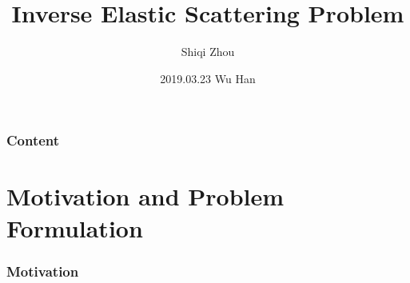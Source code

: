 \documentclass[cjk,8pt]{beamer}
\begin{document}
\begin{CJK*}{GBK}{kai}
\CJKtilde
\title[]{Inverse Elastic Scattering Problem}

\author[]{Shiqi Zhou}
\date[]{2019.03.23 Wu Han}




\begin{frame}
  \titlepage
\end{frame}

\begin{frame}
  \frametitle{Content}
  \setcounter{tocdepth}{1}
  \tableofcontents%
\end{frame}

\section{Motivation and Problem Formulation}

\begin{frame}
\frametitle{Motivation}
\begin{figure}


\end{figure}
\end{frame}
\end{CJK*}
\end{document}
